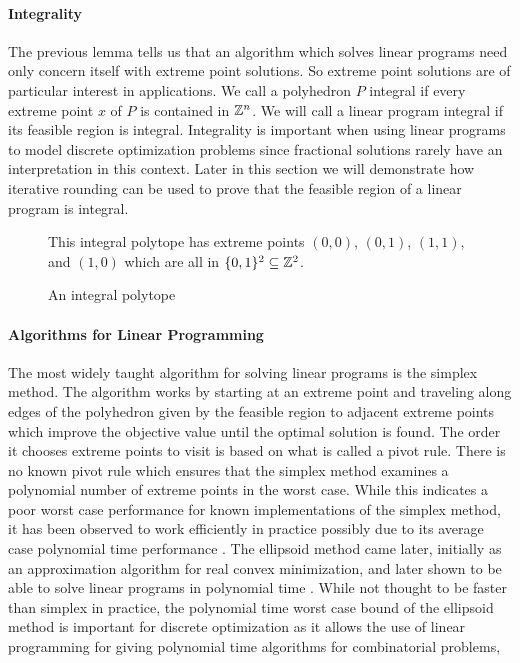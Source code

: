 \paragraph{Integrality}
The previous lemma tells us that an algorithm which solves linear programs need only concern itself with extreme point solutions. So extreme point solutions are of particular interest in applications. We call a polyhedron $P$ integral if every extreme point $x$ of $P$ is contained in $\mathbb{Z}^n$. We will call a linear program integral if its feasible region is integral. Integrality is important when using linear programs to model discrete optimization problems since fractional solutions rarely have an interpretation in this context. Later in this section we will demonstrate how iterative rounding can be used to prove that the feasible region of a linear program is integral.
\begin{figure}
\centering
{}
\caption{An integral polytope}
\small
\begin{flushleft}
This integral polytope has extreme points $(0,0)$, $(0,1)$, $(1,1)$, and $(1,0)$ which are all in $\{0,1\}^2\subseteq \mathbb{Z}^2$.
\end{flushleft}
\end{figure}
\paragraph{Algorithms for Linear Programming}
The most widely taught algorithm for solving linear programs is the simplex method\cite{dantzig1955generalized}. The algorithm works by starting at an extreme point and traveling along edges of the polyhedron given by the feasible region to adjacent extreme points which improve the objective value until the optimal solution is found. The order it chooses extreme points to visit is based on what is called a pivot rule. There is no known pivot rule which ensures that the simplex method examines a polynomial number of extreme points in the worst case. While this indicates a poor worst case performance for known implementations of the simplex method, it has been observed to work efficiently in practice possibly due to its average case polynomial time performance \cite{smale1983average}. The ellipsoid method came later, initially as an approximation algorithm for real convex minimization, and later shown to be able to solve linear programs in polynomial time \cite{grotschel1981ellipsoid}. While not thought to be faster than simplex in practice, the polynomial time worst case bound of the ellipsoid method is important for discrete optimization as it allows the use of linear programming for giving polynomial time algorithms for combinatorial problems,
